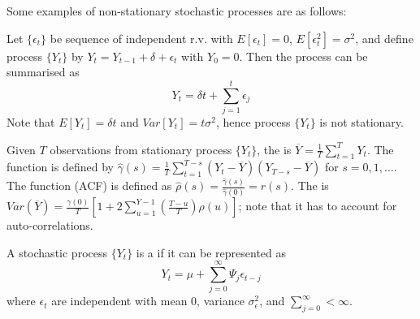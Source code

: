 Some examples of non-stationary stochastic processes are as follows:

\begin{example}  Let $\{\epsilon_t \}$ be sequence of independent r.v. with  $E[\epsilon_t] = 0$, $E[\epsilon_t^2] = \sigma^2$, and define process $\{Y_t\}$ by $Y_t = Y_{t-1} + \delta + \epsilon_t$ with $Y_0 = 0$. Then the process can be summarised as
\begin{equation}
Y_t = \delta t + \sum\limits_{j=1}^t \epsilon_j \nonumber
\end{equation}
Note that $E[Y_t] = \delta t$ and $Var[Y_t] = t \sigma^2$, hence process $\{Y_t\}$ is not stationary.
\end{example}

Given $T$ observations from stationary process $\{Y_t\}$, the  is $\overline{Y} = \frac{1}{T} \sum\limits_{t=1}^T Y_t$. The  function is defined by $\hat{\gamma}(s) = \frac{1}{T} \sum\limits_{t=1}^{T-s} (Y_t - \overline{Y})(Y_{T-s} - \overline{Y})$ for $s=0, 1, \ldots$. The  function (ACF) is defined as $\hat{\rho}(s) = \frac{\hat{\gamma}(s)}{\hat{\gamma}(0)} = r(s)$. The  is $Var(\overline{Y}) = \frac{\gamma(0)}{T}\left[1 + 2 \sum\limits_{u=1}^{Y-1} \left(\frac{T-u}{T} \right) \rho(u) \right]$; note that it has to account for auto-correlations.

\begin{definition} A stochastic process $\{Y_t\}$ is a  if it can be represented as
\begin{equation}
Y_t = \mu + \sum\limits_{j=0}^{\infty} \Psi_j \epsilon_{t-j} \nonumber
\end{equation}
where $\epsilon_t$ are independent with mean $0$, variance $\sigma_{\epsilon}^2$, and $\sum\limits_{j=0}^{\infty} < \infty$.
\end{definition}


